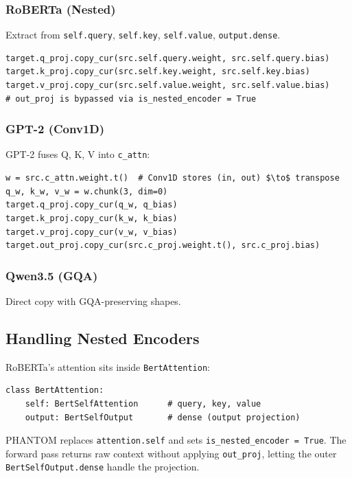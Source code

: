 \subsubsection{RoBERTa (Nested)}

Extract from \texttt{self.query}, \texttt{self.key}, \texttt{self.value}, \texttt{output.dense}.

\begin{lstlisting}
target.q_proj.copy_cur(src.self.query.weight, src.self.query.bias)
target.k_proj.copy_cur(src.self.key.weight, src.self.key.bias)
target.v_proj.copy_cur(src.self.value.weight, src.self.value.bias)
# out_proj is bypassed via is_nested_encoder = True
\end{lstlisting}

\subsubsection{GPT-2 (Conv1D)}

GPT-2 fuses Q, K, V into \texttt{c\_attn}:

\begin{lstlisting}
w = src.c_attn.weight.t()  # Conv1D stores (in, out) $\to$ transpose
q_w, k_w, v_w = w.chunk(3, dim=0)
target.q_proj.copy_cur(q_w, q_bias)
target.k_proj.copy_cur(k_w, k_bias)
target.v_proj.copy_cur(v_w, v_bias)
target.out_proj.copy_cur(src.c_proj.weight.t(), src.c_proj.bias)
\end{lstlisting}

\subsubsection{Qwen3.5 (GQA)}

Direct copy with GQA-preserving shapes.

\subsection{Handling Nested Encoders}

RoBERTa's attention sits inside \texttt{BertAttention}:

\begin{lstlisting}
class BertAttention:
    self: BertSelfAttention      # query, key, value
    output: BertSelfOutput       # dense (output projection)
\end{lstlisting}

PHANTOM replaces \texttt{attention.self} and sets \texttt{is\_nested\_encoder = True}. The 
forward pass returns raw context without applying \texttt{out\_proj}, letting the 
outer \texttt{BertSelfOutput.dense} handle the projection.

